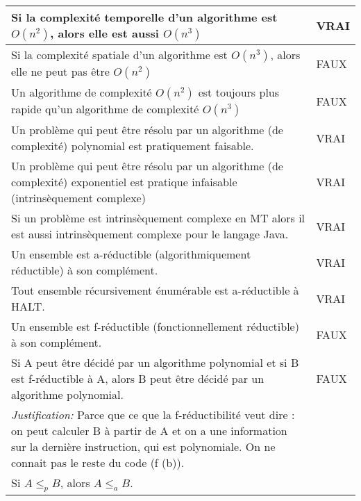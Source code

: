\begin{tabular}{p{13cm}|l}
    Si la complexité temporelle d'un algorithme est $O(n^{2})$, alors elle est aussi $O(n^{3})$ & VRAI \\
    \hline
    Si la complexité spatiale d'un algorithme est $O(n^{3})$, alors elle ne peut pas être $O(n^{2})$  & FAUX \\
    \hline
    Un algorithme de complexité $O(n^{2})$ est toujours plus rapide qu'un algorithme de complexité $O(n^{3})$ & FAUX \\
    \hline
    Un problème qui peut être résolu par un algorithme (de complexité) polynomial est pratiquement faisable. & VRAI \\
    \hline
    Un problème qui peut être résolu par un algorithme (de complexité) exponentiel est pratique infaisable (intrinsèquement complexe) & VRAI \\
    \hline
    Si un problème est intrinsèquement complexe en MT alors il est aussi intrinsèquement complexe pour le langage Java.& VRAI\\
    \hline
    Un ensemble est a-réductible (algorithmiquement réductible) à son complément.& VRAI\\
    \hline
    Tout ensemble récursivement énumérable est a-réductible à HALT. & VRAI\\
    \hline
    Un ensemble est f-réductible (fonctionnellement réductible) à son complément. & FAUX \\
    \hline
    Si A peut être décidé par un algorithme polynomial et si B est f-réductible à A, alors B peut être décidé par un algorithme polynomial. & FAUX \\
    \textit{Justification:} Parce que ce que la f-réductibilité veut dire : on peut calculer B à partir de A et on a une information sur la dernière instruction, qui est polynomiale. On ne connait pas le reste du code (f (b)). &\\
    \hline
    Si $A \leq_{p} B$, alors $A \leq_{a} B$. \\
    \hline
\end{tabular}